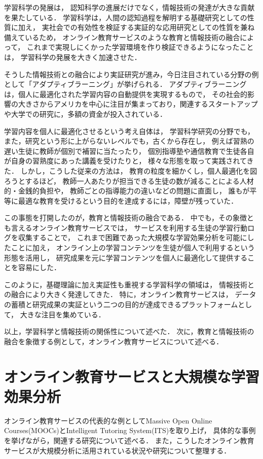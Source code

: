 学習科学の発展は，
認知科学の進展だけでなく，情報技術の発達が大きな貢献を果たしている．
学習科学は，人間の認知過程を解明する基礎研究としての性質に加え，
実社会での有効性を検証する実証的な応用研究としての性質を兼ね備えているため，
オンライン教育サービスのような教育と情報技術の融合によって，
これまで実現しにくかった学習環境を作り検証できるようになったことは，
学習科学の発展を大きく加速させた．

そうした情報技術との融合により実証研究が進み，今日注目されている分野の例として「アダプティブラーニング」が挙げられる\cite{carbonell1970ai, midgley2014goals}．
アダプティブラーニングは，個人に最適化された学習内容の自動提供を実現するもので，
その社会的影響の大きさからアメリカを中心に注目が集まっており，関連するスタートアップや大学での研究に，多額の資金が投入されている\cite{piccioli2014learning}．

学習内容を個人に最適化させるという考え自体は，
学習科学研究の分野でも，また，研究という形に上がらないレベルでも，古くから存在し，
例えば習熟の遅い生徒に教師が個別で補習に当たったり，
個別指導塾や通信教育で生徒各自が自身の習熟度にあった講義を受けたりと，
様々な形態を取って実践されてきた．
しかし，こうした従来の方法は，
教育の粒度を細かくし，個人最適化を図ろうとするほど，
教師一人あたりが担当できる生徒の数が減ることによる人材的・金銭的負担や，
教師ごとの指導能力の違いなどの問題に直面し，
誰もが平等に最適な教育を受けるという目的を達成するには，障壁が残っていた．

この事態を打開したのが，教育と情報技術の融合である．
中でも，その象徴とも言えるオンライン教育サービスでは，
サービスを利用する生徒の学習行動ログを収集することで，
これまで困難であった大規模な学習効果分析を可能にしたことに加え，
オンライン上の学習コンテンツを生徒が個人で利用するという形態を活用し，
研究成果を元に学習コンテンツを個人に最適化して提供することを容易にした．


このように，基礎理論に加え実証性も重視する学習科学の領域は，
情報技術との融合により大きく発達してきた．
特に，オンライン教育サービスは，
データの蓄積と研究成果の実証という二つの目的が達成できるプラットフォームとして，
大きな注目を集めている．



以上，学習科学と情報技術の関係性について述べた．
次に，教育と情報技術の融合を象徴する例として，オンライン教育サービスについて述べる．




\section{オンライン教育サービスと大規模な学習効果分析}
オンライン教育サービスの代表的な例としてMassive Open Online Courses(MOOCs)とIntelligent Tutoring System(ITS)を取り上げ，
具体的な事例を挙げながら，関連する研究について述べる．
また，こうしたオンライン教育サービスが大規模分析に活用されている状況や研究について整理する．


